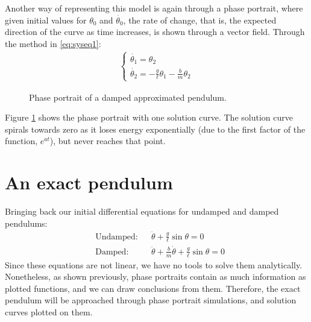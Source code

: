 \documentclass[12pt, a4paper, titlepage]{article}
\theoremstyle{definition}
\numberwithin{equation}{section}
\theoremstyle{definition}
\theoremstyle{definition}
\begin{document}
Another way of representing this model is again through a phase portrait, where given initial values for $\theta_0$ and $\dot{\theta_0}$, the rate of change, that is, the expected direction of the curve as time increases, is shown through a vector field. Through the method in \eqref{eq:syseq1}:
\begin{align}
\begin{cases}
\dot{\theta_1}=\theta_2\\
\dot{\theta_2}=-\frac{g}{\ell}\theta_1-\frac{b}{m}\theta_2
\end{cases}
\end{align}
\begin{figure}[H]
    \centering
    
    \caption{Phase portrait of a damped approximated pendulum.}
    \label{fig:phase_approx_damped}
\end{figure}
Figure \ref{fig:phase_approx_damped} shows the phase portrait with one solution curve. The solution curve spirals towards zero as it loses energy exponentially (due to the first factor of the function, $e^{at}$), but never reaches that point.

\section{An exact pendulum}
Bringing back our initial differential equations for undamped and damped pendulums:
\begin{align}
&\text{Undamped:}&&\ddot{\theta}+\frac{g}{\ell}\sin\theta=0\label{eq:undamped_exact}\\
&\text{Damped:}&&\ddot{\theta}+\frac{b}{m}\dot{\theta}+\frac{g}{\ell}\sin\theta=0\label{eq:damped_exact}
\end{align}
Since these equations are not linear, we have no tools to solve them analytically. Nonetheless, as shown previously, phase portraits contain as much information as plotted functions, and we can draw conclusions from them. Therefore, the exact pendulum will be approached through phase portrait simulations, and solution curves plotted on them.
\end{document}
